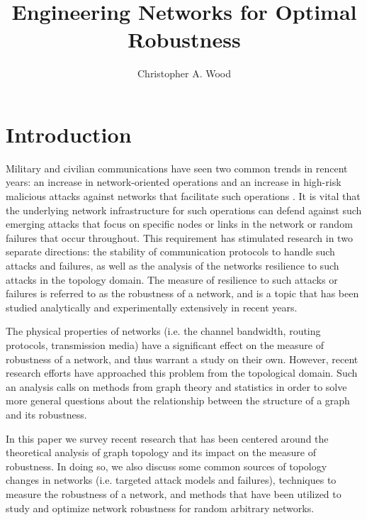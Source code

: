 \documentclass[doc]{apa}%
\title{Engineering Networks for Optimal Robustness}
\author{Christopher A. Wood}
\affiliation{Department of Computer Science \\ Rochester Institute of Technology}
\begin{document}
\maketitle   

\section{Introduction}

Military and civilian communications have seen two common trends in rencent years: an increase in network-oriented operations and an increase in high-risk malicious attacks against networks that facilitate such operations \cite{Bernardnetworkrobustness}. It is vital that the underlying network infrastructure for such operations can defend against such emerging attacks that focus on specific nodes or links in the network or random failures that occur throughout. This requirement has stimulated research in two separate directions: the stability of communication protocols to handle such attacks and failures, as well as the analysis of the networks resilience to such attacks in the topology domain. The measure of resilience to such attacks or failures is referred to as the robustness of a network, and is a topic that has been studied analytically and experimentally extensively in recent years.

The physical properties of networks (i.e. the channel bandwidth, routing protocols, transmission media) have a significant effect on the measure of robustness of a network, and thus warrant a study on their own. However, recent research efforts have approached this problem from the topological domain. Such an analysis calls on methods from graph theory and statistics in order to solve more general questions about the relationship between the structure of a graph and its robustness. 

In this paper we survey recent research that has been centered around the theoretical analysis of graph topology and its impact on the measure of robustness. In doing so, we also discuss some common sources of topology changes in networks (i.e. targeted attack models and failures), techniques to measure the robustness of a network, and methods that have been utilized to study and optimize network robustness for random arbitrary networks.

\end{document}

